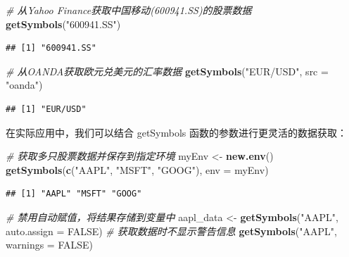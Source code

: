 \documentclass[]{ctexbook}
\newenvironment{Shaded}{\begin{snugshade}}{\end{snugshade}}
\newcommand{\AttributeTok}[1]{\textcolor[rgb]{0.13,0.29,0.53}{#1}}
\newcommand{\CommentTok}[1]{\textcolor[rgb]{0.56,0.35,0.01}{\textit{#1}}}
\newcommand{\ConstantTok}[1]{\textcolor[rgb]{0.56,0.35,0.01}{#1}}
\newcommand{\FunctionTok}[1]{\textcolor[rgb]{0.13,0.29,0.53}{\textbf{#1}}}
\newcommand{\NormalTok}[1]{#1}
\newcommand{\OtherTok}[1]{\textcolor[rgb]{0.56,0.35,0.01}{#1}}
\newcommand{\StringTok}[1]{\textcolor[rgb]{0.31,0.60,0.02}{#1}}
\begin{document}
\begin{Shaded}
\begin{Highlighting}[]
\CommentTok{\# 从Yahoo Finance获取中国移动(600941.SS)的股票数据}
\FunctionTok{getSymbols}\NormalTok{(}\StringTok{"600941.SS"}\NormalTok{)}
\end{Highlighting}
\end{Shaded}

\begin{verbatim}
## [1] "600941.SS"
\end{verbatim}

\begin{Shaded}
\begin{Highlighting}[]
\CommentTok{\# 从OANDA获取欧元兑美元的汇率数据}
\FunctionTok{getSymbols}\NormalTok{(}\StringTok{"EUR/USD"}\NormalTok{, }\AttributeTok{src =} \StringTok{"oanda"}\NormalTok{)}
\end{Highlighting}
\end{Shaded}

\begin{verbatim}
## [1] "EUR/USD"
\end{verbatim}

在实际应用中，我们可以结合 getSymbols 函数的参数进行更灵活的数据获取：

\begin{Shaded}
\begin{Highlighting}[]
\CommentTok{\# 获取多只股票数据并保存到指定环境}
\NormalTok{myEnv }\OtherTok{\textless{}{-}} \FunctionTok{new.env}\NormalTok{()}
\FunctionTok{getSymbols}\NormalTok{(}\FunctionTok{c}\NormalTok{(}\StringTok{"AAPL"}\NormalTok{, }\StringTok{"MSFT"}\NormalTok{, }\StringTok{"GOOG"}\NormalTok{), }\AttributeTok{env =}\NormalTok{ myEnv)}
\end{Highlighting}
\end{Shaded}

\begin{verbatim}
## [1] "AAPL" "MSFT" "GOOG"
\end{verbatim}

\begin{Shaded}
\begin{Highlighting}[]
\CommentTok{\# 禁用自动赋值，将结果存储到变量中}
\NormalTok{aapl\_data }\OtherTok{\textless{}{-}} \FunctionTok{getSymbols}\NormalTok{(}\StringTok{"AAPL"}\NormalTok{, }\AttributeTok{auto.assign =} \ConstantTok{FALSE}\NormalTok{)}
\CommentTok{\# 获取数据时不显示警告信息}
\FunctionTok{getSymbols}\NormalTok{(}\StringTok{"AAPL"}\NormalTok{, }\AttributeTok{warnings =} \ConstantTok{FALSE}\NormalTok{)}
\end{Highlighting}
\end{Shaded}
\end{document}
